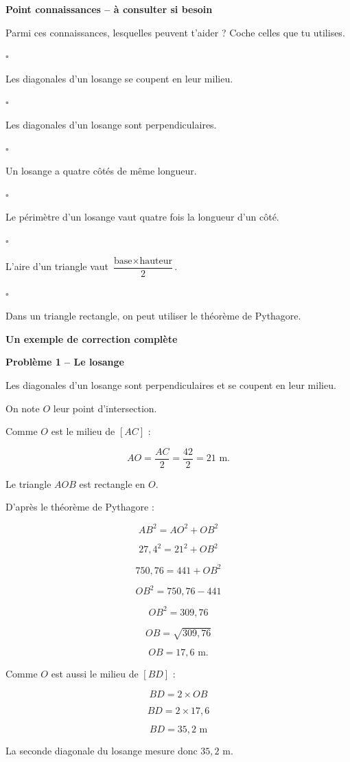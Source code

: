 \documentclass[11pt,a4paper]{article}
\newcommand{\titrecorrection}[1]{%
\noindent
\begin{minipage}{\linewidth}
\centering
{\sffamily\LARGE\bfseries\color{TitreC}
Un exemple de correction complète}

\vspace{0.5mm}

{\sffamily\large\bfseries\color{SavoirC}
#1}
\end{minipage}

\vspace{2mm}
}
\newcommand{\casecocher}[1]{%
\noindent
\(\square\)\hspace{0.35em}%
\parbox[t]{0.89\linewidth}{#1}
\par
\vspace{0.15em}
}
\newcommand{\pagecorrection}[2]{%

\titrecorrection{#1}

\begin{correctionbox}

#2

\end{correctionbox}
}
\begin{document}
\begin{connaissancesbox}

{\sffamily\bfseries\color{SavoirC}
Point connaissances -- à consulter si besoin}

\smallskip

Parmi ces connaissances, lesquelles peuvent t'aider ?
Coche celles que tu utilises.

\smallskip

\begin{minipage}[t]{0.49\linewidth}

\casecocher{Les diagonales d'un losange se coupent en leur milieu.}

\casecocher{Les diagonales d'un losange sont perpendiculaires.}

\casecocher{Un losange a quatre côtés de même longueur.}

\end{minipage}
\hfill
\begin{minipage}[t]{0.49\linewidth}

\casecocher{Le périmètre d'un losange vaut quatre fois la longueur d'un côté.}

\casecocher{L'aire d'un triangle vaut
\(\dfrac{\text{base}\times\text{hauteur}}{2}\).}

\casecocher{Dans un triangle rectangle, on peut utiliser
le théorème de Pythagore.}

\end{minipage}

\end{connaissancesbox}

\newpage


\pagecorrection{Problème 1 -- Le losange}{

Les diagonales d'un losange sont perpendiculaires et se coupent
en leur milieu.

On note \(O\) leur point d'intersection.

Comme \(O\) est le milieu de \([AC]\) :

\[
AO=\frac{AC}{2}
=\frac{42}{2}
=21\text{ m}.
\]

Le triangle \(AOB\) est rectangle en \(O\).

D'après le théorème de Pythagore :

\[
AB^2=AO^2+OB^2
\]

\[
27{,}4^2=21^2+OB^2
\]

\[
750{,}76=441+OB^2
\]

\[
OB^2=750{,}76-441
\]

\[
OB^2=309{,}76
\]

\[
OB=\sqrt{309{,}76}
\]

\[
OB=17{,}6\text{ m}.
\]

Comme \(O\) est aussi le milieu de \([BD]\) :

\[
BD=2\times OB
\]

\[
BD=2\times17{,}6
\]

\[
\boxed{BD=35{,}2\text{ m}}
\]

La seconde diagonale du losange mesure donc
\(\boxed{35{,}2\text{ m}}\).
}
\end{document}
